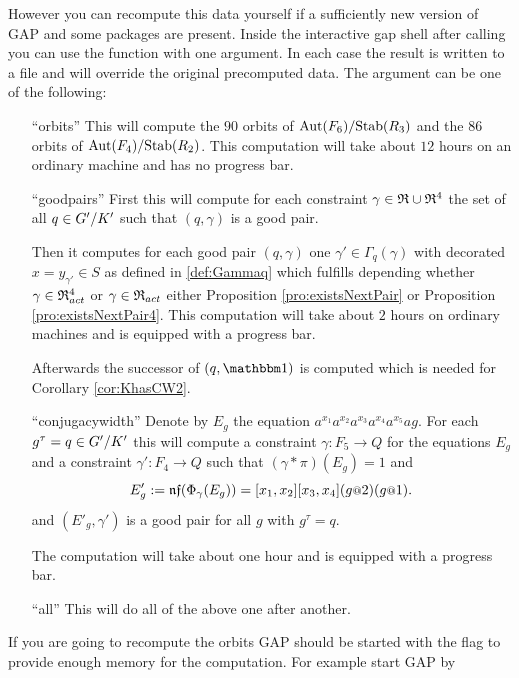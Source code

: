 \documentclass[a4paper,11pt]{amsart}
\begin{document}
However you can recompute this data yourself if a sufficiently new version of GAP and
some packages are present. Inside the interactive gap shell after calling 
you can use the function  with one argument. In each case
the result is written to a file and will override the original precomputed data. The 
argument can be one of the following:
\begin{itemize}
    \item [``orbits''] This will compute the $90$ orbits of ${\textup{Aut}(F_6)/\textup{Stab}(R_3)}$ and the
		       $86$ orbits of ${\textup{Aut}(F_4)/\textup{Stab}(R_2)}$. This computation will take
		       about $12$ hours on an ordinary machine and has no progress bar.
   \item [``goodpairs''] First this will compute for each constraint $\gamma\in\mathfrak{R}\cup\mathfrak{R}^4$ 
		      the set of all $q\in{G'/K'}$ such that $(q,\gamma)$ is a good pair.
		      
		      Then it computes for each good pair $(q,\gamma)$ one $\gamma'\in\Gamma_q(\gamma)$
		      with decorated $x=y_{\gamma'}\in S$ as defined in \ref{def:Gammaq} which 
		      fulfills depending whether $\gamma\in\mathfrak{R}^4_{act}$ or $\gamma\in\mathfrak{R}_{act}$ 
		      either Proposition \ref{pro:existsNextPair} or Proposition \ref{pro:existsNextPair4}.
		      This computation will take about $2$ hours on ordinary machines and is equipped 
		      with a progress bar. 
		      
		      Afterwards the successor of $(q,\id)$ is computed which is needed for 
		      Corollary \ref{cor:KhasCW2}. 
   \item [``conjugacywidth''] Denote by $E_g$ the equation $a^{x_1}a^{x_2}a^{x_3}a^{x_4}a^{x_5}ag$.
		      For each $g^\tau=q\in{G'/K'}$ this will compute a constraint 
		      $\gamma\colon F_5 \to Q$ for the equations $E_g$
		      and a constraint $\gamma'\colon F_4\to Q$ such that
		      $(\gamma * \pi)(E_g) = 1$ and 
		      \[E'_g := \nf(\Phi_\gamma(E_g))=[x_1,x_2][x_3,x_4](g\at{2})(g\at{1}).\] and
		      $(E'_g,\gamma')$ is a good pair for all $g$ with $g^\tau=q$.
		      
		      The computation will take about one hour and is equipped with a progress bar.
  \item [``all''] This will do all of the above one after another.		      
   \end{itemize}
If you are going to recompute the orbits GAP should be started with the  flag
to provide enough memory for the computation. For example start GAP by 
\end{document}
